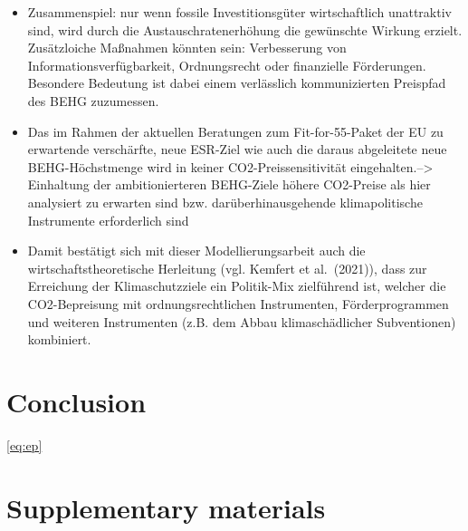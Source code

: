 \documentclass[12pt,twoside]{reedthesis}
\begin{document}
\begin{itemize}
\item
  Zusammenspiel: nur wenn fossile Investitionsgüter wirtschaftlich unattraktiv sind, wird durch die Austauschratenerhöhung die gewünschte Wirkung erzielt. Zusätzloiche Maßnahmen könnten sein: Verbesserung von Informationsverfügbarkeit, Ordnungsrecht oder finanzielle Förderungen. Besondere Bedeutung ist dabei einem verlässlich kommunizierten Preispfad des BEHG zuzumessen.
\item
  Das im Rahmen der aktuellen Beratungen zum Fit-for-55-Paket der EU zu erwartende verschärfte, neue ESR-Ziel wie auch die daraus abgeleitete neue BEHG-Höchstmenge wird in keiner CO2-Preissensitivität eingehalten.--\textgreater{} Einhaltung der ambitionierteren BEHG-Ziele höhere CO2-Preise als hier analysiert zu erwarten sind bzw. darüberhinausgehende klimapolitische Instrumente erforderlich sind
\item
  Damit bestätigt sich mit dieser Modellierungsarbeit auch die wirtschaftstheoretische Herleitung (vgl. Kemfert et al.~(2021)), dass zur Erreichung der Klimaschutzziele ein Politik-Mix zielführend ist, welcher die CO2-Bepreisung mit ordnungsrechtlichen Instrumenten, Förderprogrammen und weiteren Instrumenten (z.B. dem Abbau klimaschädlicher Subventionen) kombiniert.
\end{itemize}
\hypertarget{conclusion}{%
\chapter{Conclusion}\label{conclusion}}

\eqref{eq:ep}

\appendix

\hypertarget{supplementary-materials}{%
\chapter{Supplementary materials}\label{supplementary-materials}}
\end{document}
